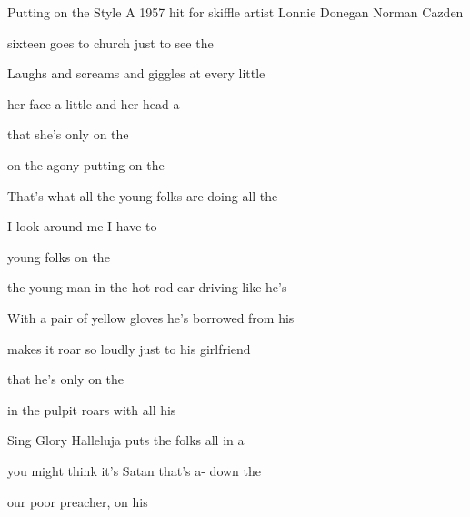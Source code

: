 \begin{SBSong}{Putting on the Style}
  {A 1957 hit for skiffle artist Lonnie Donegan}
  {Norman Cazden}
  \begin{SBVerse}
     sixteen goes to church just to see the 

    Laughs and screams and giggles at every little 

     her face a little and  her head a  

      that she's only  on the 
  \end{SBVerse}
  \begin{SBChorus}
     on the agony putting on the 

    That's what all the young folks are doing all the 

     I look around me I  have to 

      young folks  on the 
  \end{SBChorus}
  \begin{SBVerse}
     the young man in the hot rod car driving like he's 

    With a pair of yellow gloves he's borrowed from his 

     makes it roar so loudly just to  his girlfriend  

      that he's only  on the 
  \end{SBVerse}
  \begin{SBVerse}
     in the pulpit roars with all his 

    Sing Glory Halleluja puts the folks all in a 

     you might think it's Satan that's a- down the 

      our poor preacher,  on his 
  \end{SBVerse}
\end{SBSong}

